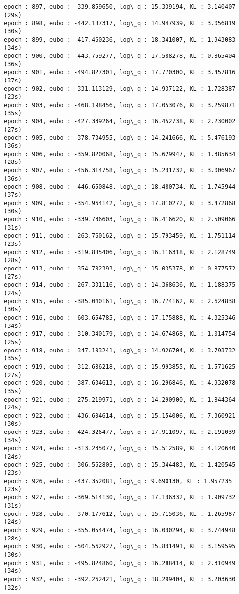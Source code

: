\documentclass[11pt]{article}
\begin{document}
\begin{Verbatim}[commandchars=\\\{\}]
epoch : 897, eubo : -339.859650, log\_q : 15.339194, KL : 3.140407 (29s)
epoch : 898, eubo : -442.187317, log\_q : 14.947939, KL : 3.056819 (30s)
epoch : 899, eubo : -417.460236, log\_q : 18.341007, KL : 1.943083 (34s)
epoch : 900, eubo : -443.759277, log\_q : 17.588278, KL : 0.865404 (36s)
epoch : 901, eubo : -494.827301, log\_q : 17.770300, KL : 3.457816 (37s)
epoch : 902, eubo : -331.113129, log\_q : 14.937122, KL : 1.728387 (23s)
epoch : 903, eubo : -468.198456, log\_q : 17.053076, KL : 3.259871 (35s)
epoch : 904, eubo : -427.339264, log\_q : 16.452738, KL : 2.230002 (27s)
epoch : 905, eubo : -378.734955, log\_q : 14.241666, KL : 5.476193 (36s)
epoch : 906, eubo : -359.820068, log\_q : 15.629947, KL : 1.385634 (28s)
epoch : 907, eubo : -456.314758, log\_q : 15.231732, KL : 3.006967 (36s)
epoch : 908, eubo : -446.650848, log\_q : 18.480734, KL : 1.745944 (37s)
epoch : 909, eubo : -354.964142, log\_q : 17.810272, KL : 3.472868 (30s)
epoch : 910, eubo : -339.736603, log\_q : 16.416620, KL : 2.509066 (31s)
epoch : 911, eubo : -263.760162, log\_q : 15.793459, KL : 1.751114 (23s)
epoch : 912, eubo : -319.885406, log\_q : 16.116318, KL : 2.128749 (28s)
epoch : 913, eubo : -354.702393, log\_q : 15.035378, KL : 0.877572 (27s)
epoch : 914, eubo : -267.331116, log\_q : 14.368636, KL : 1.188375 (24s)
epoch : 915, eubo : -385.040161, log\_q : 16.774162, KL : 2.624838 (30s)
epoch : 916, eubo : -603.654785, log\_q : 17.175888, KL : 4.325346 (34s)
epoch : 917, eubo : -310.340179, log\_q : 14.674868, KL : 1.014754 (25s)
epoch : 918, eubo : -347.103241, log\_q : 14.926704, KL : 3.793732 (35s)
epoch : 919, eubo : -312.686218, log\_q : 15.993855, KL : 1.571625 (27s)
epoch : 920, eubo : -387.634613, log\_q : 16.296846, KL : 4.932078 (35s)
epoch : 921, eubo : -275.219971, log\_q : 14.290900, KL : 1.844364 (24s)
epoch : 922, eubo : -436.604614, log\_q : 15.154006, KL : 7.360921 (30s)
epoch : 923, eubo : -424.326477, log\_q : 17.911097, KL : 2.191039 (34s)
epoch : 924, eubo : -313.235077, log\_q : 15.512589, KL : 4.120640 (24s)
epoch : 925, eubo : -306.562805, log\_q : 15.344483, KL : 1.420545 (23s)
epoch : 926, eubo : -437.352081, log\_q : 9.690130, KL : 1.957235 (23s)
epoch : 927, eubo : -369.514130, log\_q : 17.136332, KL : 1.909732 (31s)
epoch : 928, eubo : -370.177612, log\_q : 15.715036, KL : 1.265987 (24s)
epoch : 929, eubo : -355.054474, log\_q : 16.030294, KL : 3.744948 (28s)
epoch : 930, eubo : -504.562927, log\_q : 15.831491, KL : 3.159595 (30s)
epoch : 931, eubo : -495.824860, log\_q : 16.288414, KL : 2.310949 (34s)
epoch : 932, eubo : -392.262421, log\_q : 18.299404, KL : 3.203630 (32s)

\end{Verbatim}
\end{document}
